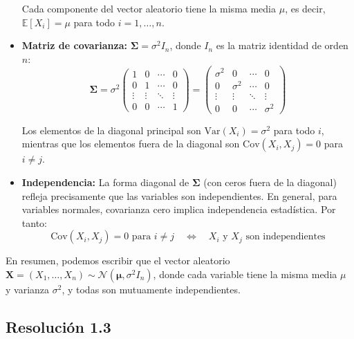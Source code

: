 \documentclass[
  11pt,
  letterpaper,
   addpoints,
  answers
  ]{exam}
\begin{document}
\begin{questions}
\begin{solution}
\begin{itemize}
  Cada componente del vector aleatorio tiene la misma media $\mu$, es decir, $\mathbb{E}[X_i] = \mu$ para todo $i = 1, \ldots, n$.
  
  \item \textbf{Matriz de covarianza:} $\boldsymbol{\Sigma} = \sigma^2 I_n$, donde $I_n$ es la matriz identidad de orden $n$:
  \begin{equation}
  \boldsymbol{\Sigma} = \sigma^2 \begin{pmatrix}
  1 & 0 & \cdots & 0 \\
  0 & 1 & \cdots & 0 \\
  \vdots & \vdots & \ddots & \vdots \\
  0 & 0 & \cdots & 1
  \end{pmatrix} = \begin{pmatrix}
  \sigma^2 & 0 & \cdots & 0 \\
  0 & \sigma^2 & \cdots & 0 \\
  \vdots & \vdots & \ddots & \vdots \\
  0 & 0 & \cdots & \sigma^2
  \end{pmatrix}
  \end{equation}
  
  Los elementos de la diagonal principal son $\text{Var}(X_i) = \sigma^2$ para todo $i$, mientras que los elementos fuera de la diagonal son $\text{Cov}(X_i, X_j) = 0$ para $i \neq j$.
  
  \item \textbf{Independencia:} La forma diagonal de $\boldsymbol{\Sigma}$ (con ceros fuera de la diagonal) refleja precisamente que las variables son independientes. En general, para variables normales, covarianza cero implica independencia estadística. Por tanto:
  \begin{equation}
  \text{Cov}(X_i, X_j) = 0 \text{ para } i \neq j \quad \Longleftrightarrow \quad X_i \text{ y } X_j \text{ son independientes}
  \end{equation}
  \end{itemize}
  
  En resumen, podemos escribir que el vector aleatorio $\mathbf{X} = (X_1, \ldots, X_n) \sim \mathcal{N}(\boldsymbol{\mu}, \sigma^2 I_n)$, donde cada variable tiene la misma media $\mu$ y varianza $\sigma^2$, y todas son mutuamente independientes.

  \subsection*{Resolución 1.3}
  

\end{solution}
\end{questions}
\end{document}

